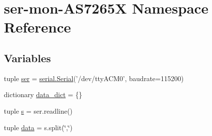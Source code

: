 \hypertarget{namespaceser-mon-AS7265X}{\section{ser-\/mon-\/\-A\-S7265\-X Namespace Reference}
\label{namespaceser-mon-AS7265X}
}
\subsection*{Variables}
\begin{DoxyCompactItemize}
\item 
tuple \hyperlink{namespaceser-mon-AS7265X_a14d3bc0154dd41ac4329c332a73a9f85}{ser} = \hyperlink{HardwareSerial_8h_a7b8c4a195c58f9eb8750e94955c5aa4b}{serial.\-Serial}('/dev/tty\-A\-C\-M0', baudrate=115200)
\item 
dictionary \hyperlink{namespaceser-mon-AS7265X_a2ca2a7586fd8176729e53f614af30eff}{data\-\_\-dict} = \{\}
\item 
tuple \hyperlink{namespaceser-mon-AS7265X_a9378f765d3cec20083312b237c585e4a}{s} = ser.\-readline()
\item 
tuple \hyperlink{namespaceser-mon-AS7265X_aee1f9cc5d7cb69238c16b1063ac2ca72}{data} = s.\-split(\char`\"{},\char`\"{})
\end{DoxyCompactItemize}


